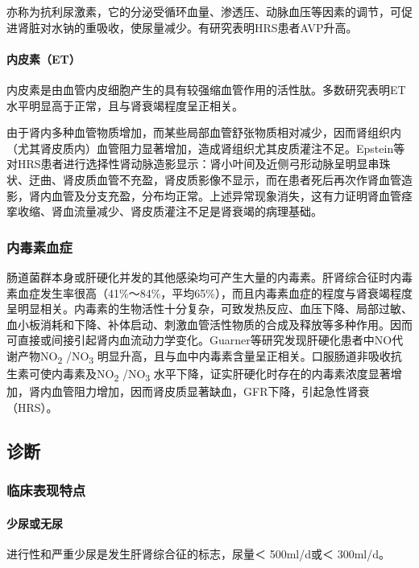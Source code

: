亦称为抗利尿激素，它的分泌受循环血量、渗透压、动脉血压等因素的调节，可促进肾脏对水钠的重吸收，使尿量减少。有研究表明HRS患者AVP升高。

\paragraph{内皮素（ET）}

内皮素是由血管内皮细胞产生的具有较强缩血管作用的活性肽。多数研究表明ET水平明显高于正常，且与肾衰竭程度呈正相关。

由于肾内多种血管物质增加，而某些局部血管舒张物质相对减少，因而肾组织内（尤其肾皮质内）血管阻力显著增加，造成肾组织尤其皮质灌注不足。Epstein等对HRS患者进行选择性肾动脉造影显示：肾小叶间及近侧弓形动脉呈明显串珠状、迂曲、肾皮质血管不充盈，肾皮质影像不显示，而在患者死后再次作肾血管造影，肾内血管及分支充盈，分布均正常。上述异常现象消失，这有力证明肾血管痉挛收缩、肾血流量减少、肾皮质灌注不足是肾衰竭的病理基础。

\subsubsection{内毒素血症}

肠道菌群本身或肝硬化并发的其他感染均可产生大量的内毒素。肝肾综合征时内毒素血症发生率很高（41\%～84\%，平均65\%），而且内毒素血症的程度与肾衰竭程度呈明显相关。内毒素的生物活性十分复杂，可致发热反应、血压下降、局部过敏、血小板消耗和下降、补体启动、刺激血管活性物质的合成及释放等多种作用。因而可直接或间接引起肾内血流动力学变化。Guarner等研究发现肝硬化患者中NO代谢产物NO\textsubscript{2}
/NO\textsubscript{3}
明显升高，且与血中内毒素含量呈正相关。口服肠道非吸收抗生素可使内毒素及NO\textsubscript{2}
/NO\textsubscript{3}
水平下降，证实肝硬化时存在的内毒素浓度显著增加，肾内血管阻力增加，因而肾皮质显著缺血，GFR下降，引起急性肾衰（HRS）。

\subsection{诊断}

\subsubsection{临床表现特点}

\paragraph{少尿或无尿}

进行性和严重少尿是发生肝肾综合征的标志，尿量＜ 500ml/d或＜ 300ml/d。


